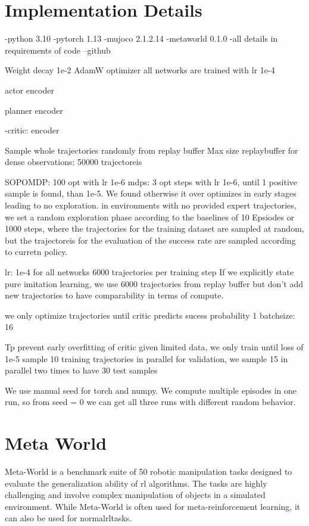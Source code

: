 \chapter{Implementation Details}
\label{chapter:DetailedDescriptions}\label{appendix}
-python 3.10
-pytorch 1.13
-mujoco 2.1.2.14
-metaworld 0.1.0
-all details in requirements of code --github

Weight decay 1e-2
AdamW optimizer
all networks are trained with lr 1e-4

actor
encoder


planner
encoder

-critic:
encoder 

Sample whole trajectories randomly from replay buffer
Max size replaybuffer for dense observations: 50000 trajectoreis

SOPOMDP:
100 opt with lr 1e-6
\ac{mdp}s:
3 opt steps with lr 1e-6, until 1 positive sample is found, than 1e-5. We found otherwise it over optimizes in early stages leading to no 
exploration. 
in environments with no provided expert trajectories, we set a random exploration phase according to the baselines of 10 Epsiodes or 1000 steps, where 
the trajectories for the training dataset are sampled at random, but the trajectoreis for the evaluation of the success rate are sampled according to 
curretn policy.


lr: 1e-4 for all networks
6000 trajectories per training step
If we explicitly state pure imitation learning, we use 6000 trajectories from replay buffer but don't add new trajectories to have 
comparability in terms of compute.

we only optimize trajectories until critic predicts sucess probability 1
batchsize: 16

Tp prevent early overfitting of critic given limited data, we only train until loss of 1e-5 
sample 10 training trajectories in parallel
for validation, we sample 15 in parallel two times to have 30 test samples

We use manual seed for torch and numpy. We compute multiple episodes in one run, so from seed = 0 we can get all three runs with different random behavior. 


\chapter{Meta World}
\label{chapter:MetaWorld}
Meta-World \cite{yu2019meta} is a benchmark suite of 50 robotic manipulation tasks designed to evaluate the generalization ability of \ac{rl} 
algorithms. The tasks are highly challenging and involve complex manipulation of objects in a simulated environment. 
While Meta-World is often used for meta-reinforcement learning, it can also be used for normal\ac{rl}tasks.

